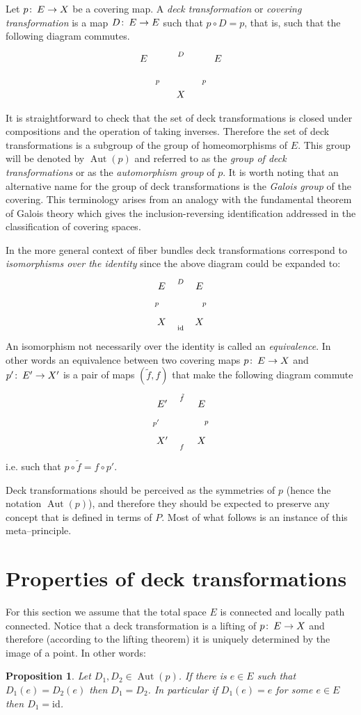 \documentclass[12pt]{article}
\newtheorem{prop}[thm]{Proposition}
\theoremstyle{definition}
\theoremstyle{remark}
\numberwithin{equation}{subsection}
\newcommand{\Au}{\operatorname{Aut}}
\def\co{\colon\thinspace}
\begin{document}
Let $p\co E\to X$ be a covering map.  A \emph{deck transformation} or
\emph{covering transformation} is a map $D\co E\to E$ such that $p\circ
D=p$, that is, such that the following diagram commutes.
$$\xymatrix{ {E}\ar[dr]_{p}\ar[rr]^{D}&&{E}\ar[dl]^{p}\\
          &{X}&  }$$

It is straightforward to check that the set of deck transformations is closed
under compositions and the operation of taking inverses. Therefore the set
of deck transformations is a subgroup of the group of homeomorphisms of $E$. 
This group  will be denoted by $\Au(p)$ and referred
to as the \emph{group of deck transformations} or as the \emph{automorphism
group} of $p$.  It is worth noting that an alternative name for the group of deck transformations is the \emph{Galois group} of the covering.  This terminology arises from an analogy with the fundamental theorem of Galois theory which gives the inclusion-reversing identification addressed in the classification of covering spaces.

In the more general context of fiber bundles deck transformations correspond
to \emph{isomorphisms over the identity} since the above diagram could be
expanded to:
  $$\xymatrix{ {E}\ar[d]_{p}\ar[r]^{D}&{E}\ar[d]^{p}\\
               {X}\ar[r]_{\text{id}}& {X}  }$$ 
An isomorphism not necessarily over the identity is called an
\emph{equivalence}. In other words an equivalence between two covering maps    
 $p\co E\to X$ and  $p'\co E'\to X'$ is a pair of maps $(\tilde f,f)$ that make the
 following diagram commute
$$\xymatrix{ {E'}\ar[d]_{p'}\ar[r]^{\tilde f}&{E}\ar[d]^{p}\\
               {X'}\ar[r]_{f}& {X}  }$$ 
 i.e. such that $p\circ\tilde f=f\circ p'$.

Deck transformations should be perceived as the symmetries of $p$ (hence the
notation $\Au(p)$), and therefore they should be expected to preserve any
concept 
that is defined in
terms of $P$. Most of what follows is an instance of this meta--principle.


\section*{Properties of deck transformations}
For this section  we assume that  the total space $E$ is connected and locally
path connected.
Notice that a deck transformation is a lifting of $p\co E\to X$ and
therefore (according to the lifting theorem) it is uniquely determined by
the image of a point. In other words:
\begin{prop}\label{prop:uniq}
  Let  $D_1,D_2\in \Au(p)$. If there is  $e\in E$ such that $D_1(e)=D_2(e)$
  then $D_1=D_2$. In particular if $D_1(e)=e$ for some $e\in E$ then
  $D_1=\text{id}$.  
\end{prop}
\end{document}
